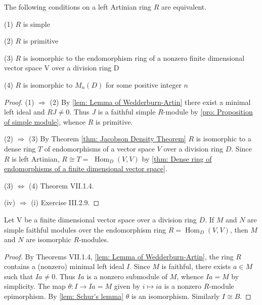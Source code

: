 \begin{theorem}
    The following conditions on a left Artinian ring $R$ are equivalent.

    (1) $R$ is simple

    (2) $R$ is primitive

    (3) $R$ is isomorphic to the endomorphism ring of a nonzero finite dimensional vector space V over a division ring D

    (4) $R$ is isomorphic to $M_n\left(D\right)$ for some positive integer $n$

    \begin{proof}
        (1) $\Rightarrow$ (2)
        By \ref{lem: Lemma of Wedderburn-Artin}
        there exist a minimal left ideal and $R J \neq 0$.
        Thus $J$ is a faithful simple $R$-module by \ref{pro: Proposition of simple module}, whence $R$ is primitive.

        (2) $\Rightarrow$ (3) By Theorem \ref{thm: Jacobson Density Theorem} $R$ is isomorphic to a dense ring $T$ of endomorphisms of a vector space $V$ over a division ring $D$. Since $R$ is left Artinian, $R \cong T=$ $\operatorname{Hom}_D(V, V)$ by \ref{thm: Dense ring of endomorphisms of a finite dimensional vector space}.

        (3) $\Leftrightarrow$ (4) Theorem VII.1.4.

        (iv) $\Rightarrow$ (i) Exercise III.2.9.
    \end{proof}
\end{theorem}

\begin{lemma}
    Let V be a finite dimensional vector space over a division ring $D$.
    If $M$ and $N$ are simple faithful modules over the endomorphism ring $R=\operatorname{Hom}_{D}(V, V)$, then $M$ and $N$ are isomorphic $R$-modules.

    \begin{proof}
        By Theorems VII.1.4, \ref{lem: Lemma of Wedderburn-Artin}, the ring $R$ contains a (nonzero) minimal left ideal $I$.
        Since $M$ is faithful, there exists $a \in M$ such that $I a \neq 0$. Thus $I a$ is a nonzero submodule of $M$, whence $I a=M$ by simplicity.
        The map $\theta: I \rightarrow I a=M$ given by $i \mapsto i a$ is a nonzero $R$-module epimorphism. By \ref{lem: Schur's lemma}  $\theta$ is an isomorphism. Similarly $I \cong B$.
    \end{proof}
\end{lemma}

